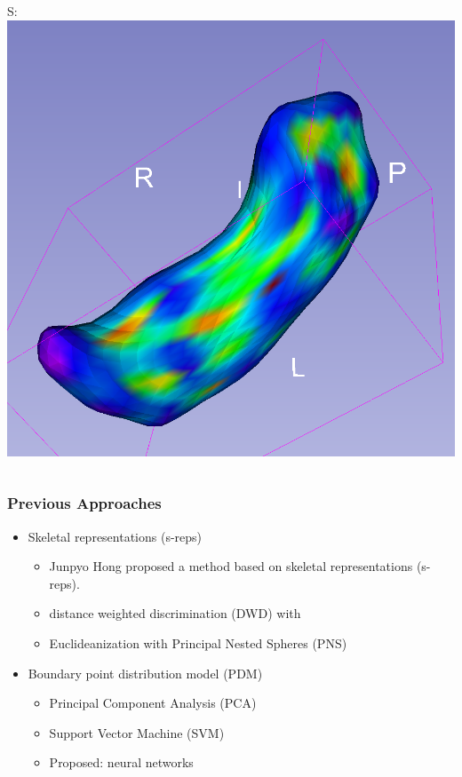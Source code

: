 \documentclass{beamer}
\begin{document}
\begin{frame}
\begin{columns}
\begin{column}{0.5\textwidth}
\begin{center}
    S: \includegraphics[width=0.5\linewidth]{NS.png}
    \end{center}
\end{column}
\end{columns}

\end{frame}

\begin{frame}
\frametitle{Previous Approaches}
\begin{itemize}
    \item Skeletal representations (s-reps)
    \begin{itemize}
        \item Junpyo Hong proposed a method based on skeletal representations (s-reps).
        \item distance weighted discrimination (DWD) with
        \item Euclideanization with Principal Nested Spheres (PNS)
    \end{itemize}
    \item Boundary point distribution model (PDM)
    \begin{itemize}
        \item Principal Component Analysis (PCA)
        \item Support Vector Machine (SVM)
        \item Proposed: neural networks
    \end{itemize}
\end{itemize}
\end{frame}
\end{document}
